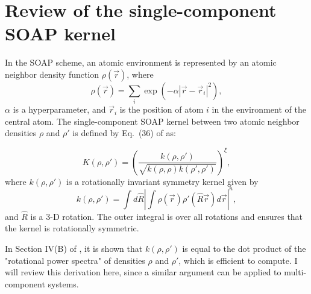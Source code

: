 \documentclass[%
preprint,
amsmath,amssymb,
aps,
]{revtex4-1}
\begin{document}
\section{Review of the single-component SOAP kernel}

In the SOAP scheme, an atomic environment is represented by an atomic neighbor density function $\rho(\vec{r})$, where
\begin{equation}
\rho(\vec{r}) = \sum_i \exp\left(-\alpha | \vec{r} - \vec{r}_i|^2 \right),
\end{equation}
$\alpha$ is a hyperparameter, and $\vec{r}_i$ is the position of atom $i$ in the environment of the central atom. The single-component SOAP kernel between two atomic neighbor densities $\rho$ and $\rho'$ is defined by Eq.\ (36) of \cite{bartok2013representing} as:

\begin{equation}
    K(\rho, \rho') = \left(\frac{k (\rho, \rho')}{\sqrt{k(\rho, \rho) k(\rho', \rho')}} \right) ^{\xi},
\end{equation}
where $k(\rho, \rho')$ is a rotationally invariant symmetry kernel given by
\begin{equation}
k(\rho, \rho') = \int d\hat{R} \left| \int \rho(\vec{r}) \rho'(\hat{R}\vec{r}) d\vec{r} \right| ^n,
\end{equation}
and $\hat{R}$ is a 3-D rotation. The outer integral is over all rotations and ensures that the kernel is rotationally symmetric.

In Section IV(B) of \cite{bartok2013representing}, it is shown that $k(\rho, \rho')$ is equal to the dot product of the "rotational power spectra" of densities $\rho$ and $\rho'$, which is efficient to compute. I will review this derivation here, since a similar argument can be applied to multi-component systems.
\end{document}
